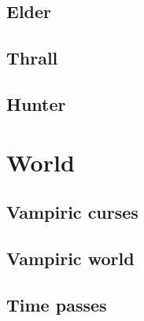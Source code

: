 \documentclass[a4paper, 12pt, finnish]{article}
\begin{document}
	\subsection{Elder}\label{ssec:elder} %
		
	\subsection{Thrall}\label{ssec:thrall}
		
	\subsection{Hunter}\label{ssec:hunter}
		
\section{World}
	\subsection{Vampiric curses} \label{ssec:curses} %
		
	\subsection{Vampiric world} \label{ssec:vampire_world}
		
	\subsection{Time passes} \label{ssec:time_passes}
		
\end{document}
